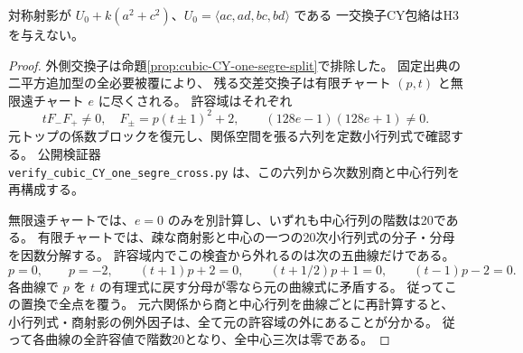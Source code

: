\begin{proposition}\label{prop:cubic-CY-one-segre-two-squares-empty}
対称射影が $U_0+k(a^2+c^2)$、$U_0=\langle ac,ad,bc,bd\rangle$ である
一交換子CY包絡はH3を与えない。
\end{proposition}
\begin{proof}
外側交換子は命題\ref{prop:cubic-CY-one-segre-split}で排除した。
固定出典\cite{AS4CYpinned}の二平方追加型の全必要被覆により、
残る交差交換子は有限チャート $(p,t)$ と無限遠チャート $e$ に尽くされる。
許容域はそれぞれ
\[
 t F_-F_+\ne0,\quad F_\pm=p(t\pm1)^2+2,
 \qquad (128e-1)(128e+1)\ne0 .
\]
元トップの係数ブロックを復元し、関係空間を張る六列を定数小行列式で確認する。
公開検証器\\
\texttt{verify\_cubic\_CY\_one\_segre\_cross.py}\quad
は、この六列から次数別商と中心行列を再構成する。

無限遠チャートでは、$e=0$ のみを別計算し、いずれも中心行列の階数は20である。
有限チャートでは、疎な商射影と中心の一つの20次小行列式の分子・分母を因数分解する。
許容域内でこの検査から外れるのは次の五曲線だけである。
\[
 p=0,\qquad p=-2,\qquad
 (t+1)p+2=0,\qquad (t+1/2)p+1=0,\qquad (t-1)p-2=0.
\]
各曲線で $p$ を $t$ の有理式に戻す分母が零なら元の曲線式に矛盾する。
従ってこの置換で全点を覆う。
元六関係から商と中心行列を曲線ごとに再計算すると、
小行列式・商射影の例外因子は、全て元の許容域の外にあることが分かる。
従って各曲線の全許容値で階数20となり、全中心三次は零である。
\end{proof}
